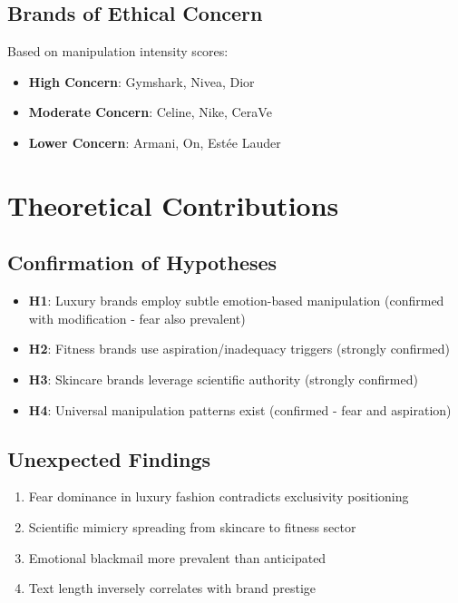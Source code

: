 \subsection{Brands of Ethical Concern}

Based on manipulation intensity scores:

\begin{itemize}
    \item \textbf{High Concern}: Gymshark, Nivea, Dior
    \item \textbf{Moderate Concern}: Celine, Nike, CeraVe
    \item \textbf{Lower Concern}: Armani, On, Estée Lauder
\end{itemize}

\section{Theoretical Contributions}

\subsection{Confirmation of Hypotheses}

\begin{itemize}
    \item[\checkmark] \textbf{H1}: Luxury brands employ subtle emotion-based manipulation (confirmed with modification - fear also prevalent)
    \item[\checkmark] \textbf{H2}: Fitness brands use aspiration/inadequacy triggers (strongly confirmed)
    \item[\checkmark] \textbf{H3}: Skincare brands leverage scientific authority (strongly confirmed)
    \item[\checkmark] \textbf{H4}: Universal manipulation patterns exist (confirmed - fear and aspiration)
\end{itemize}

\subsection{Unexpected Findings}

\begin{enumerate}
    \item Fear dominance in luxury fashion contradicts exclusivity positioning
    \item Scientific mimicry spreading from skincare to fitness sector
    \item Emotional blackmail more prevalent than anticipated
    \item Text length inversely correlates with brand prestige
\end{enumerate}

